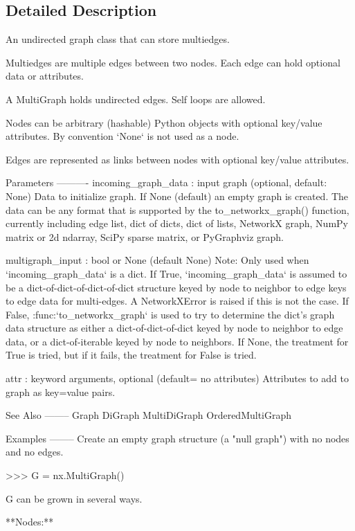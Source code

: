 \subsection{Detailed Description}
\begin{DoxyVerb}An undirected graph class that can store multiedges.

Multiedges are multiple edges between two nodes.  Each edge
can hold optional data or attributes.

A MultiGraph holds undirected edges.  Self loops are allowed.

Nodes can be arbitrary (hashable) Python objects with optional
key/value attributes. By convention `None` is not used as a node.

Edges are represented as links between nodes with optional
key/value attributes.

Parameters
----------
incoming_graph_data : input graph (optional, default: None)
    Data to initialize graph. If None (default) an empty
    graph is created.  The data can be any format that is supported
    by the to_networkx_graph() function, currently including edge list,
    dict of dicts, dict of lists, NetworkX graph, NumPy matrix
    or 2d ndarray, SciPy sparse matrix, or PyGraphviz graph.

multigraph_input : bool or None (default None)
    Note: Only used when `incoming_graph_data` is a dict.
    If True, `incoming_graph_data` is assumed to be a
    dict-of-dict-of-dict-of-dict structure keyed by
    node to neighbor to edge keys to edge data for multi-edges.
    A NetworkXError is raised if this is not the case.
    If False, :func:`to_networkx_graph` is used to try to determine
    the dict's graph data structure as either a dict-of-dict-of-dict
    keyed by node to neighbor to edge data, or a dict-of-iterable
    keyed by node to neighbors.
    If None, the treatment for True is tried, but if it fails,
    the treatment for False is tried.

attr : keyword arguments, optional (default= no attributes)
    Attributes to add to graph as key=value pairs.

See Also
--------
Graph
DiGraph
MultiDiGraph
OrderedMultiGraph

Examples
--------
Create an empty graph structure (a "null graph") with no nodes and
no edges.

>>> G = nx.MultiGraph()

G can be grown in several ways.

**Nodes:**


\end{DoxyVerb}
